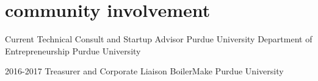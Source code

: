 \documentclass[]{friggeri-cv} %
\begin{document}
\vspace{-5pt}
\vspace{-5pt}
\section{community involvement}
\begin{entrylist}
\entry
{Current}
{Technical Consult and Startup Advisor}
{Purdue University Department of Entrepreneurship}
{Purdue University}

\entry
{2016-2017}
{Treasurer and Corporate Liaison}
{BoilerMake}
{Purdue University}


\end{entrylist}


\vspace{-5pt}
\end{document}
